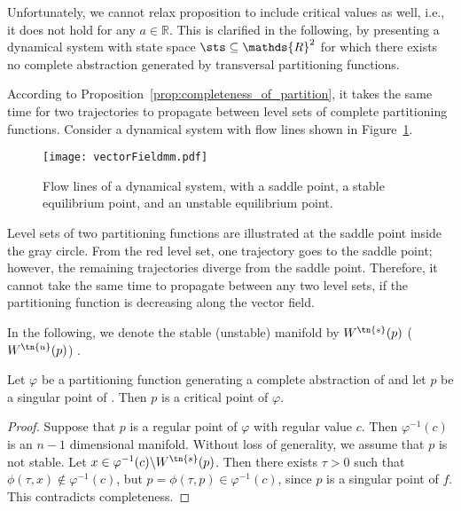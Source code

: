 Unfortunately, we cannot relax proposition to include critical values as well, i.e., it does not hold for any $a\in\mathds{R}$. This is clarified in the following, by presenting a dynamical system with state space $\sts\subseteq\mathds{R}^2$ for which there exists no complete abstraction generated by transversal partitioning functions.

According to Proposition~\ref{prop:completeness_of_partition}, it takes the same time for two trajectories to propagate between level sets of complete partitioning functions. Consider a dynamical system with flow lines shown in Figure~\ref{fig:vectorFieldmm}.
\begin{figure}[!htb]
    \centering
       \texttt{[image: vectorFieldmm.pdf]}
    \caption{Flow lines of a dynamical system, with a saddle point, a stable equilibrium point, and an unstable equilibrium point.\label{fig:vectorFieldmm}}
\end{figure}
Level sets of two partitioning functions are illustrated at the saddle point inside the gray circle. From the red level set, one trajectory goes to the saddle point; however, the remaining trajectories diverge from the saddle point. Therefore, it cannot take the same time to propagate between any two level sets, if the partitioning function is decreasing along the vector field.








In the following, we denote the stable (unstable) manifold by $W^{\tn{s}}(p)$ ($W^{\tn{u}}(p)$) \cite{hirsch}.
\begin{lemma}\label{lem:crit}
Let $\varphi$ be a partitioning function generating a complete abstraction of \dynSysAll and let $p$ be a singular point of \vectField. Then $p$ is a critical point of $\varphi$.
\end{lemma}
\begin{proof}
Suppose that $p$ is a regular point of $\varphi$ with regular value $c$. Then $\varphi^{-1}(c)$ is an $n-1$ dimensional manifold. Without loss of generality, we assume that $p$ is not stable. Let $x\in\varphi^{-1}(c)\backslash W^{\tn{s}}(p)$. Then there exists $\tau>0$ such that  $\phi(\tau,x)\notin\varphi^{-1}(c)$, but $p=\phi(\tau,p)\in\varphi^{-1}(c)$, since $p$ is a singular point of $f$. This contradicts completeness.
\end{proof}

